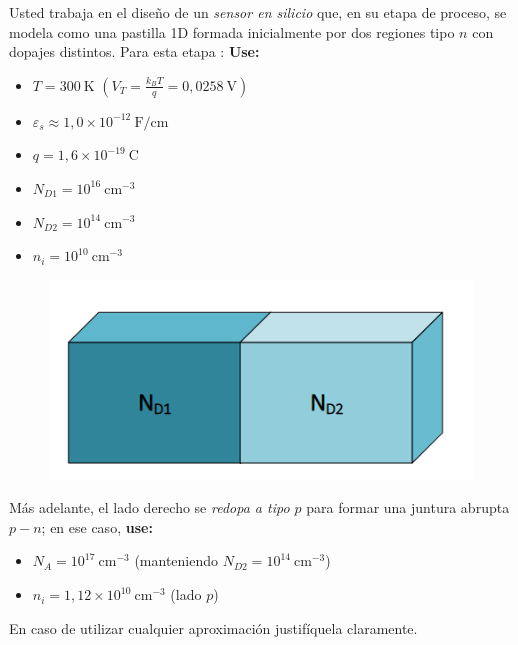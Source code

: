
Usted trabaja en el diseño de un \emph{sensor en silicio} que, en su etapa de proceso, se modela como una pastilla 1D formada inicialmente por dos regiones tipo \(n\) con dopajes distintos. Para esta etapa
:
  \textbf{Use:}
  \begin{itemize}
    \item $T=300~\mathrm{K}$ $(V_T=\tfrac{k_BT}{q}=0{,}0258~\mathrm{V})$
    \item $\varepsilon_s \approx 1{,}0\times10^{-12}~\mathrm{F/cm}$
    \item $q=1{,}6\times10^{-19}~\mathrm{C}$
    \item $N_{D1}=10^{16}~\mathrm{cm^{-3}}$
    \item $N_{D2}=10^{14}~\mathrm{cm^{-3}}$
    \item $n_i=10^{10}~\mathrm{cm^{-3}}$
  \end{itemize}
  \begin{figure}
  \centering
  \includegraphics[width=0.5\linewidth]{img/P1_2.png}
  \label{fig:nnpastilla}
  \end{figure}
Más adelante, el lado derecho se \emph{redopa a tipo \(p\)} para formar una juntura abrupta \(p\!-\!n\); en ese caso, \textbf{use:}
\begin{itemize}
  \item \(N_A=10^{17}~\mathrm{cm^{-3}}\) (manteniendo \(N_{D2}=10^{14}~\mathrm{cm^{-3}}\))
  \item \(n_i=1{,}12\times10^{10}~\mathrm{cm^{-3}}\) (lado \(p\))
\end{itemize}
En caso de utilizar cualquier aproximación justifíquela claramente.
 



